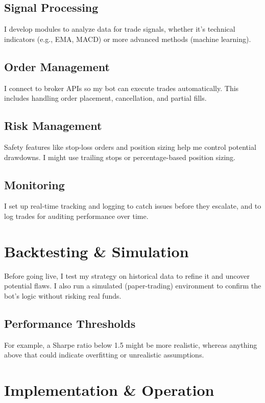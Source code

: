 \documentclass[9pt,a4paper,twocolumn,twoside]{tau-class/tau}
\begin{document}
\subsection{Signal Processing}
I develop modules to analyze data for trade signals, whether it's technical 
indicators (e.g., EMA, MACD) or more advanced methods (machine learning). 





\subsection{Order Management}
I connect to broker APIs so my bot can execute trades automatically. This 
includes handling order placement, cancellation, and partial fills.

\subsection{Risk Management}
Safety features like stop-loss orders and position sizing help me control 
potential drawdowns. I might use trailing stops or percentage-based 
position sizing.

\subsection{Monitoring}
I set up real-time tracking and logging to catch issues before they escalate, 
and to log trades for auditing performance over time.

\section{Backtesting \& Simulation}

Before going live, I test my strategy on historical data to refine it and 
uncover potential flaws. I also run a simulated (paper-trading) environment 
to confirm the bot’s logic without risking real funds. 

\subsection{Performance Thresholds}
For example, a Sharpe ratio below 1.5 might be more realistic, whereas 
anything above that could indicate overfitting or unrealistic assumptions.

\section{Implementation \& Operation}
\end{document}
